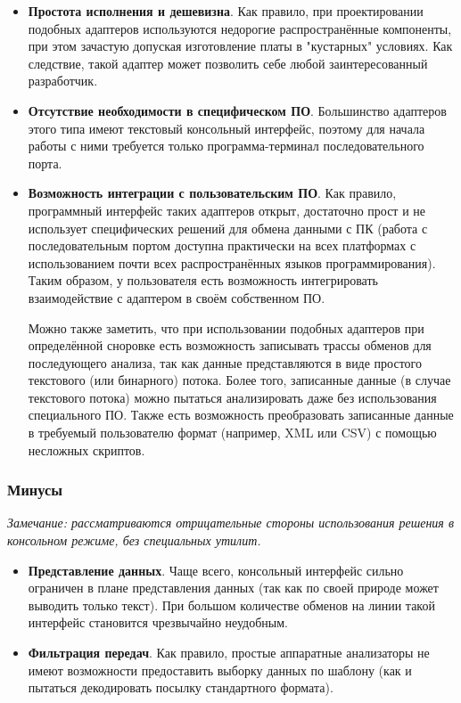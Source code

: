 \begin{itemize}

 \item \textbf{Простота исполнения и дешевизна}. Как правило, при проектировании подобных адаптеров используются недорогие распространённые компоненты, при этом зачастую допуская изготовление платы в "кустарных" условиях. Как следствие, такой адаптер может позволить себе любой заинтересованный разработчик.

 \item \textbf{Отсутствие необходимости в специфическом ПО}. Большинство адаптеров этого типа имеют текстовый консольный интерфейс, поэтому для начала работы с ними требуется только программа-терминал последовательного порта.

 \item \textbf{Возможность интеграции с пользовательским ПО}. Как правило, программный интерфейс таких адаптеров открыт, достаточно прост и не использует специфических решений для обмена данными с ПК (работа с последовательным портом доступна практически на всех платформах с использованием почти всех распространённых языков программирования). Таким образом, у пользователя есть возможность интегрировать взаимодействие с адаптером в своём собственном ПО.
 
Можно также заметить, что при использовании подобных адаптеров при определённой сноровке есть возможность записывать трассы обменов для последующего анализа, так как данные представляются в виде простого текстового (или бинарного) потока. Более того, записанные данные (в случае текстового потока) можно пытаться анализировать даже без использования специального ПО. Также есть возможность преобразовать записанные данные в требуемый пользователю формат (например, XML или CSV) с помощью несложных скриптов.

\end{itemize}

\subsubsection{Минусы}

\textit{Замечание: рассматриваются отрицательные стороны использования решения в консольном режиме, без специальных утилит.}

\begin{itemize}
 \item \textbf{Представление данных}. Чаще всего, консольный интерфейс сильно ограничен в плане представления данных (так как по своей природе может выводить только текст). При большом количестве обменов на линии такой интерфейс становится чрезвычайно неудобным.
 
 \item \textbf{Фильтрация передач}. Как правило, простые аппаратные анализаторы не имеют возможности предоставить выборку данных по шаблону (как и пытаться декодировать посылку стандартного формата).
\end{itemize}

